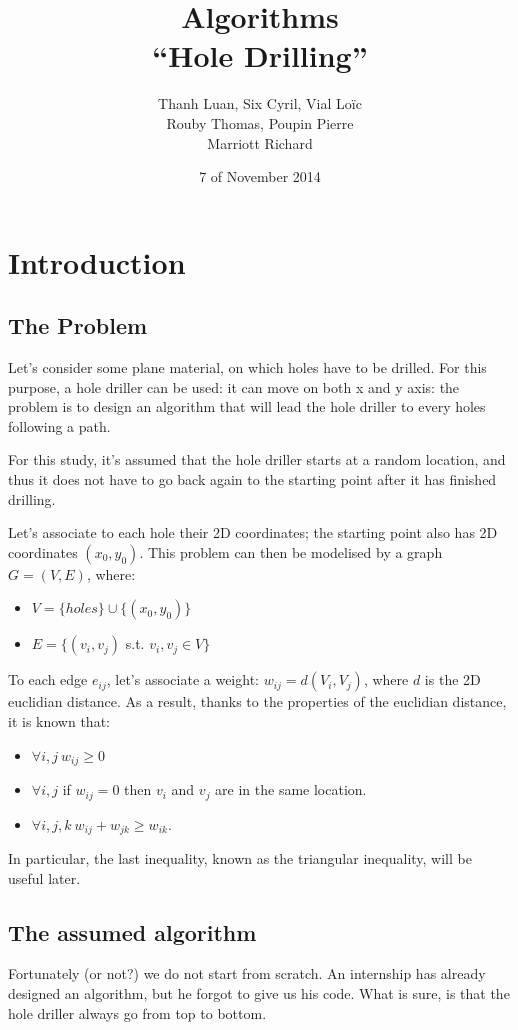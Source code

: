 \documentclass[11pt]{article}
\title{Algorithms \\
	\textbf{``Hole Drilling''}}
\author{Thanh Luan, Six Cyril, Vial Loïc \\
			Rouby Thomas, Poupin Pierre\\
			Marriott Richard}
\date{7\up{th} of November 2014}
\begin{document}
\maketitle
\tableofcontents

\section{Introduction}
\subsection{The Problem}
Let's consider some plane material, on which holes have to be drilled. For this
purpose, a hole driller can be used: it can move on both x and y axis: the
problem is to design an algorithm that will lead the hole driller to every holes
following a path.

For this study, it's assumed that the hole driller starts at a random location,
and thus it does not have to go back again to the starting point after it has
finished drilling.

Let's associate to each hole their 2D coordinates; the starting point also
has 2D coordinates $(x_0, y_0)$.
This problem can then be modelised by a graph $G = (V, E)$, where:
\begin{itemize}
	\item $V = \{holes\} \cup \{(x_0, y_0)\}$
	\item $E = \{(v_i, v_j)$ s.t. $v_i, v_j \in V\}$
\end{itemize}

To each edge $e_{ij}$, let's associate a weight: $w_{ij} = d(V_i, V_j)$, where
$d$ is the 2D euclidian distance. As a result, thanks to the properties of the
euclidian distance, it is known that:
\begin{itemize}
	\item $\forall i, j~w_{ij} \geq 0$
	\item $\forall i, j$ if $w_{ij} = 0$ then $v_i$ and $v_j$ are in the same
		location.
	\item $\forall i, j, k~w_{ij} + w_{jk} \geq w_{ik}$.
\end{itemize}

In particular, the last inequality, known as the triangular inequality, will be
useful later.

\subsection{The assumed algorithm}
Fortunately (or not?) we do not start from scratch. An internship has already
designed an algorithm, but he forgot to give us his code. What is sure, is that
the hole driller always go from top to bottom.
\end{document}
